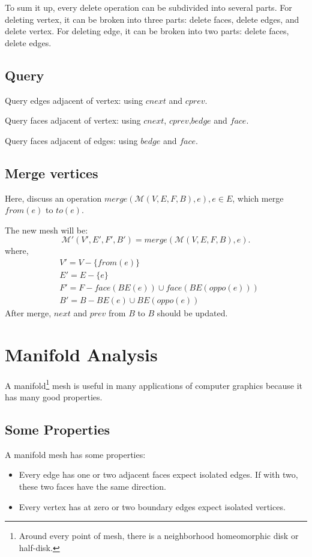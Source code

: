 \documentclass[9pt,twocolumn]{extarticle}
\begin{document}
To sum it up, every delete operation can be subdivided into several parts.
For deleting vertex, it can be broken into three parts: delete faces,
delete edges, and delete vertex. For deleting edge, it can be broken
into two parts: delete faces, delete edges.

\subsection{Query}

Query edges adjacent of vertex: using $cnext$ and $cprev$.

Query faces adjacent of vertex: using $cnext$, $cprev$,$bedge$ and $face$.

Query faces adjacent of edges: using $bedge$ and $face$.

\subsection{Merge vertices}

Here, discuss an operation $merge(\mathcal{M}(V,E,F,B),e), e\in E$, 
which merge $from(e)$ to $to(e)$.

The new mesh will be:
\begin{equation}
\mathcal{M}'(V',E',F',B')=merge(\mathcal{M}(V,E,F,B),e).
\end{equation}
where,
\begin{align}
&V' = V-\{from(e)\} \\
&E' = E-\{e\}\\
&F' = F-face(BE(e))\cup face(BE(oppo(e)))\\
&B' = B-BE(e)\cup BE(oppo(e))
\end{align}
After merge, $next$ and $prev$ from $B$ to $B$ should be updated.

\section{Manifold Analysis}

A manifold\footnote{Around every point of mesh, there is a neighborhood homeomorphic 
disk or half-disk.} mesh is useful in many applications of computer graphics 
because it has many good properties.

\subsection{Some Properties}
A manifold mesh has some properties:
\begin{itemize}
\item Every edge has one or two adjacent faces expect isolated edges. 
If with two, these two faces have the same 
direction.
\item Every vertex has at zero or two boundary edges expect isolated vertices.
\end{itemize}
\end{document}
